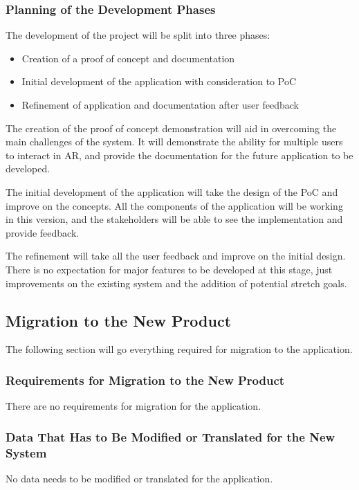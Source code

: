 \documentclass[12pt]{article}
\begin{document}

\subsubsection{Planning of the Development Phases}
The development of the project will be split into three phases:
\begin{itemize}
    \item Creation of a proof of concept and documentation
    \item Initial development of the application with consideration to PoC
    \item Refinement of application and documentation after user feedback
\end{itemize}
The creation of the proof of concept demonstration will aid in overcoming the main challenges of the system. It will demonstrate the ability for multiple users to interact in AR, and provide the documentation for the future application to be developed.

The initial development of the application will take the design of the PoC and improve on the concepts. All the components of the application will be working in this version, and the stakeholders will be able to see the implementation and provide feedback. 

The refinement will take all the user feedback and improve on the initial design. There is no expectation for major features to be developed at this stage, just improvements on the existing system and the addition of potential stretch goals. 

\subsection{Migration to the New Product}
The following section will go everything required for migration to the application.

\subsubsection{Requirements for Migration to the New Product}
There are no requirements for migration for the application.

\subsubsection{Data That Has to Be Modified or Translated for the New System}
No data needs to be modified or translated for the application.
\end{document}
